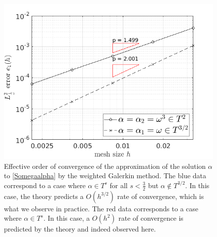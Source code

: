 \documentclass[a4paper]{article}
\begin{document}
\begin{figure}[H]
	\centering
	\hspace{-1cm}\includegraphics[scale = 0.4]{figs/ordreCVDir}
	\caption{Effective order of convergence of the approximation of the solution $\alpha$ to \eqref{Somegaalpha} by the weighted Galerkin method. The blue data correspond to a case where $\alpha \in T^{s}$ for all $s < \frac{3}{2}$ but $\alpha \notin T^{3/2}$. In this case, the theory predicts a $O(h^{3/2})$ rate of convergence, which is what we observe in practice. The red data corresponds to a case where $\alpha \in T^s$. In this case, a $O(h^2)$ rate of convergence is predicted by the theory and indeed observed here.} 
	\label{fig:errL2dir}
\end{figure}
\end{document}
